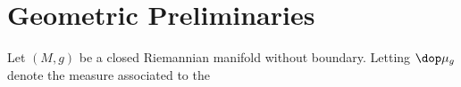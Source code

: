 \section{Geometric Preliminaries}
Let $(M,g)$ be a closed Riemannian manifold without boundary. Letting $\dop \mu_g$ denote the measure associated to the 